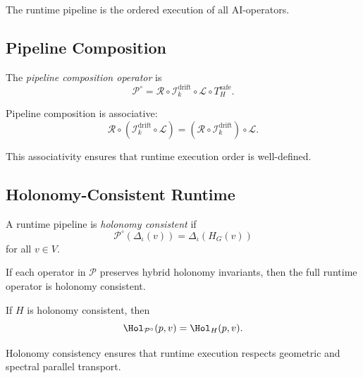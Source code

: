 \begin{remark}
The runtime pipeline is the ordered execution of all AI-operators.
\end{remark}

\subsection{Pipeline Composition}

\begin{definition}
The \emph{pipeline composition operator} is
\[
\mathcal{P}^\circ
= \mathcal{R} \circ \mathcal{I}_k^\mathrm{drift}
\circ \mathcal{L} \circ T_H^\mathrm{safe}.
\]
\end{definition}

\begin{lemma}
Pipeline composition is associative:
\[
\mathcal{R} \circ (\mathcal{I}_k^\mathrm{drift} \circ \mathcal{L})
= (\mathcal{R} \circ \mathcal{I}_k^\mathrm{drift}) \circ \mathcal{L}.
\]
\end{lemma}

\begin{remark}
This associativity ensures that runtime execution order is well-defined.
\end{remark}

\subsection{Holonomy-Consistent Runtime}

\begin{definition}
A runtime pipeline is \emph{holonomy consistent} if
\[
\mathcal{P}^\circ(\Delta_\iota(v))
= \Delta_\iota(H_G(v))
\]
for all $v \in V$.
\end{definition}

\begin{lemma}
If each operator in $\mathcal{P}$ preserves hybrid holonomy invariants,
then the full runtime operator is holonomy consistent.
\end{lemma}

\begin{theorem}
If $H$ is holonomy consistent, then
\[
\Hol_{\mathcal{P}^\circ}(p,v)
= \Hol_H(p,v).
\]
\end{theorem}

\begin{remark}
Holonomy consistency ensures that runtime execution respects geometric and
spectral parallel transport.
\end{remark}

